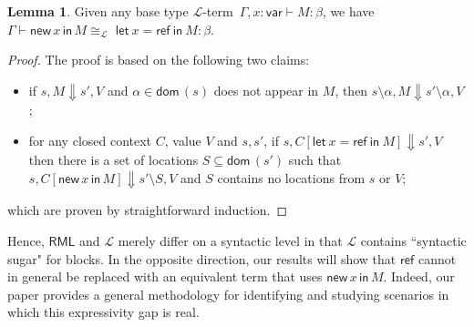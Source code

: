 \documentclass{CSML}
\theoremstyle{definition}\newtheorem{definition}[thm]{Definition}
\theoremstyle{definition}\newtheorem{example}[thm]{Example}
\theoremstyle{definition}\newtheorem{proposition}[thm]{Proposition}
\theoremstyle{definition}\newtheorem{lemma}[thm]{Lemma}
\theoremstyle{definition}\newtheorem{theorem}[thm]{Theorem}
\theoremstyle{definition}\newtheorem{corollary}[thm]{Corollary}
\theoremstyle{definition}\newtheorem{remark}[thm]{Remark}
\newcommand\nt[1]{#1}
\newcommand\am[1]{#1}
\newcommand\dom[1]{\mathsf{dom}\,#1}
\newcommand\eqmod[1]{\cong_{#1}}
\newcommand\rml{\mathsf{RML}}
\newcommand\letin[2]{\mathsf{let}\ #1\ \mathsf{in}\ #2}
\newcommand\vart{\mathsf{var}}
\newcommand\cutout[1]{}
\newcommand\seq[2]{{#1} \vdash {#2}}
\newcommand\lang{\mathcal{L}}
\newcommand\new[2]{\mathsf{new}\,#1\,\mathsf{in}\,#2}
\newcommand\newc{\mathsf{ref}}
\begin{document}
\nt{
\begin{lemma}
Given any base type \am{$\lang$-term}\, $\seq{\Gamma,x:\vart}{M:\beta}$, we have $\seq{\Gamma}{\new{x}{M}\eqmod{\am{\lang}}}$ $\letin{x=\newc}{M}:\beta$.
\end{lemma}
\begin{proof}
The proof is based on the following two claims:
\begin{itemize}
\item if $s,M\Downarrow s',V$ and $\alpha\in\dom(s)$ does not appear in $M$, then $s\setminus\alpha,M\Downarrow s'\setminus\alpha,V$;
\item for any closed context $C$, value $V$ and $s,s'$, if
$s,C[\letin{x=\newc}{M}]\Downarrow s',V$ then there is a set of locations $S\subseteq\dom(s')$ such that 
$s,C[\new{x}{M}]\Downarrow s'\setminus S,V$ and $S$ contains no locations from $s$ or $V$;
\end{itemize}
which are proven by straightforward induction.
\cutout{ following fact without proof: if $s,M\Downarrow s',V$ and $\alpha\in\dom(s)$ does not appear in $M$, then $s\setminus\alpha,M\Downarrow s'\setminus\alpha,V$.
Let us write $M_1$ for $\letin{x=\newc}{M}$, and $M_2$ for $\new{x}{M}$.
We now show that, for any closed context $C$, value $V$ and $s,s'$, if
$s,C[M_1]\Downarrow s',V$ then there is a set of locations $S\subseteq\dom(s')$ such that 
$s,C[M_2]\Downarrow s'\setminus S,V$ and $S$ contains no locations from $s$ or $V$. We argue by induction on $C$. In the base case, $C[M_1]\equiv M_1$ and the claim clearly holds as $M$ is of base type. For the inductive case, consider $C\equiv C_1C_2$ and suppose $s,C_1[M_1]\Downarrow s_1,\lambda x.N$ and $s_1,C_2[M_1]\Downarrow s_2,V'$ and $s_2,N[V'/x]\Downarrow s',V$. Then, by IH, we have that $s,C_1[M_1]\Downarrow s_1\setminus S_1,\lambda x.N$ for some set of names $S_1$ fresh for $s,N$. By the above fact, and since $s$ is compatible with $C_2[M_1]$, we have 
$s_1\setminus S_1,C_2[M_1]\Downarrow s_2\setminus S_1,V'$ and, hence by the IH, 
$s_1\setminus S_1,C_2[M_2]\Downarrow s_2\setminus S,V'$ for some $S$ extending $S_1$ with names fresh for $s_1,V'$. We moreover have $s_2\setminus S,N[V'/x]\Downarrow s'\setminus S,V$, which yields the claim. The other inductive cases are treated similarly.

\nt{Mention the two facts in the proof, say proven by easy induction.}}
\end{proof}}

Hence, 
$\rml$ and $\lang$ merely differ on a syntactic level in that $\lang$
contains ``syntactic sugar" for blocks. In the opposite direction, 
our results will show that $\newc$ cannot in general be replaced
with an equivalent term that uses $\new{x}{M}$. Indeed, our paper provides 
a general methodology for identifying and studying scenarios 
in which this expressivity gap is real.
\end{document}
